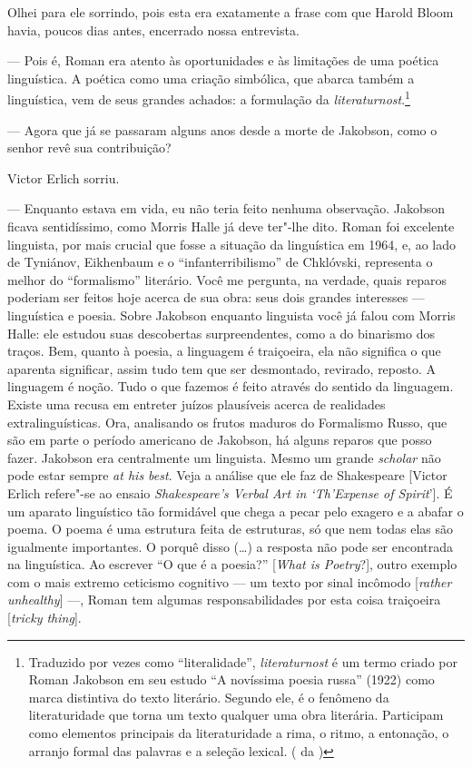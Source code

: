 Olhei para ele sorrindo, pois esta era exatamente a frase com que Harold
Bloom havia, poucos dias antes, encerrado nossa entrevista.

--- Pois é, Roman era atento às oportunidades e às limitações de uma
poética linguística. A poética como uma criação simbólica, que abarca
também a linguística, vem de seus grandes achados: a formulação da
\emph{literaturnost}.\footnote{Traduzido por vezes como 
``literalidade'', \emph{literaturnost} é um termo criado por Roman 
Jakobson em seu estudo ``A novíssima poesia russa'' 
(1922) como marca distintiva do texto literário. Segundo ele, é o
 fenômeno da literaturidade que torna um texto qualquer uma obra
 literária. Participam como elementos principais da literaturidade 
a rima, o ritmo, a entonação, o arranjo formal das palavras e a
 seleção lexical. ( da )}

--- Agora que já se passaram alguns anos desde a morte de Jakobson, como o
senhor revê sua contribuição?

Victor Erlich sorriu.

--- Enquanto estava em vida, eu não teria feito nenhuma observação.
Jakobson ficava sentidíssimo, como Morris Halle já deve ter"-lhe dito.
Roman foi excelente linguista, por mais crucial que fosse a situação da
linguística em 1964, e, ao lado de Tyniánov, Eikhenbaum e o
``infanterribilismo'' de Chklóvski, representa o melhor do
``formalismo'' literário. Você me pergunta, na verdade, quais reparos poderiam ser feitos
hoje acerca de sua obra: seus dois grandes interesses --- linguística e
poesia. Sobre Jakobson enquanto linguista você já falou com Morris Halle: ele
estudou suas descobertas surpreendentes, como a do binarismo dos traços.
Bem, quanto à poesia, a linguagem é traiçoeira, ela não significa o que
aparenta significar, assim tudo tem que ser desmontado, revirado,
reposto. A linguagem é noção. Tudo o que fazemos é feito através do sentido da
linguagem. Existe uma recusa em entreter juízos plausíveis acerca de
realidades extralinguísticas. Ora, analisando os frutos maduros do Formalismo Russo, que são em parte
o período americano de Jakobson, há alguns reparos que posso fazer.
 Jakobson era centralmente um linguista. Mesmo um grande \emph{scholar} não pode
estar sempre \emph{at his best}.
Veja a análise que ele faz de Shakespeare [Victor Erlich
 refere"-se ao ensaio \emph{Shakespeare's Verbal Art in `Th'Expense of
 Spirit}']. É um aparato linguístico tão formidável que chega a
pecar pelo exagero e a abafar o poema. O poema é uma estrutura feita de
estruturas, só que nem todas elas são igualmente importantes. O porquê
disso (\ldots{}) a resposta não pode ser encontrada na linguística.
 Ao escrever ``O que é a poesia?'' [\emph{What is
 Poetry}?], outro exemplo com o mais extremo
ceticismo cognitivo --- um texto por sinal incômodo [\emph{rather
unhealthy}] ---, Roman tem algumas responsabilidades por esta coisa
traiçoeira [\emph{tricky thing}].

